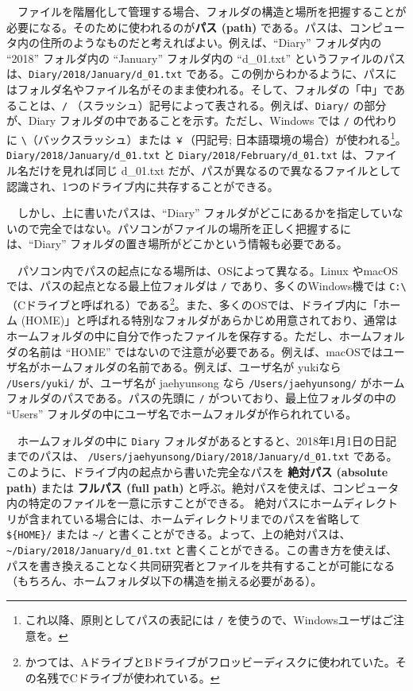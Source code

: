 \documentclass[
  a4paper,
  pandoc,
  ja=standard,
  jafont=haranoaji]{bxjsbook}
\begin{document}
　ファイルを階層化して管理する場合、フォルダの構造と場所を把握することが必要になる。そのために使われるのが\textbf{パス
(path)}
である。パスは、コンピュータ内の住所のようなものだと考えればよい。例えば、``Diary''
フォルダ内の ``2018'' フォルダ内の ``January'' フォルダ内の
``d\_01.txt''
というファイルのパスは、\texttt{Diary/2018/January/d\_01.txt}
である。この例からわかるように、パスにはフォルダ名やファイル名がそのまま使われる。そして、フォルダの「中」であることは、\texttt{/}
（スラッシュ）記号によって表される。例えば、\texttt{Diary/}
の部分が、Diary フォルダの中であることを示す。ただし、Windows では
\texttt{/} の代わりに
\texttt{\textbackslash{}}（バックスラッシュ）または \texttt{￥}（円記号;
日本語環境の場合）が使われる\footnote{これ以降、原則としてパスの表記には
  \texttt{/} を使うので、Windowsユーザはご注意を。}。
\texttt{Diary/2018/January/d\_01.txt} と
\texttt{Diary/2018/February/d\_01.txt} は、ファイル名だけを見れば同じ
d\_01.txt
だが、パスが異なるので異なるファイルとして認識され、1つのドライブ内に共存することができる。

　しかし、上に書いたパスは、``Diary''
フォルダがどこにあるかを指定していないので完全ではない。パソコンがファイルの場所を正しく把握するには、``Diary''
フォルダの置き場所がどこかという情報も必要である。

　パソコン内でパスの起点になる場所は、OSによって異なる。Linux
やmacOSでは、パスの起点となる最上位フォルダは \texttt{/}
であり、多くのWindows機では \texttt{C:\textbackslash{}}
（Cドライブと呼ばれる）である\footnote{かつては、AドライブとBドライブがフロッビーディスクに使われていた。その名残でCドライブが使われている。}。また、多くのOSでは、ドライブ内に「ホーム
(HOME)」と呼ばれる特別なフォルダがあらかじめ用意されており、通常はホームフォルダの中に自分で作ったファイルを保存する。ただし、ホームフォルダの名前は
``HOME''
ではないので注意が必要である。例えば、macOSではユーザ名がホームフォルダの名前である。例えば、ユーザ名が
yukiなら \texttt{/Users/yuki/} が、ユーザ名が jaehyunsong なら
\texttt{/Users/jaehyunsong/} がホームフォルダのパスである。パスの先頭に
\texttt{/} がついており、最上位フォルダの中の ``Users''
フォルダの中にユーザ名でホームフォルダが作られれている。

　ホームフォルダの中に \texttt{Diary}
フォルダがあるとすると、2018年1月1日の日記までのパスは、
\texttt{/Users/jaehyunsong/Diary/2018/January/d\_01.txt}
である。このように、ドライブ内の起点から書いた完全なパスを
\textbf{絶対パス (absolute path)} または \textbf{フルパス (full path)}
と呼ぶ。絶対パスを使えば、コンピュータ内の特定のファイルを一意に示すことができる。
絶対パスにホームディレクトリが含まれている場合には、ホームディレクトリまでのパスを省略して
\texttt{\$\{HOME\}/} または \texttt{\textasciitilde{}/}
と書くことができる。よって、上の絶対パスは、\texttt{\textasciitilde{}/Diary/2018/January/d\_01.txt}
と書くことができる。この書き方を使えば、パスを書き換えることなく共同研究者とファイルを共有することが可能になる（もちろん、ホームフォルダ以下の構造を揃える必要がある）。
\end{document}
